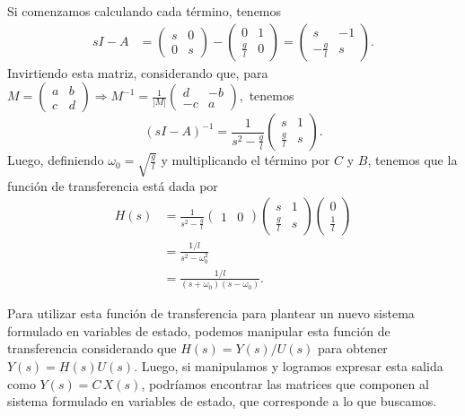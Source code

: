 \documentclass[
  11pt,
  letterpaper,
   addpoints,
  answers
  ]{exam}
\begin{document}
\begin{questions}
\begin{solution}
Si comenzamos calculando cada término, tenemos
\begin{align}
sI-A&=
\begin{pmatrix}s&0\\[2pt]0&s\end{pmatrix}-
\begin{pmatrix}0&1\\[2pt]\frac{g}{l}&0\end{pmatrix}
=
\begin{pmatrix}
s&-1\\[2pt]
-\frac{g}{l}&s
\end{pmatrix}.
\end{align}
Invirtiendo esta matriz, considerando que, para
\(
M=\begin{pmatrix}a&b\\ c&d\end{pmatrix}
\Rightarrow
M^{-1}=\frac{1}{|M|}
\begin{pmatrix}d&-b\\ -c&a\end{pmatrix},
\)
tenemos
\begin{equation}
(sI-A)^{-1}=\frac{1}{s^{2}-\frac{g}{l}}
\begin{pmatrix}
s&1\\[2pt]
\frac{g}{l}&s
\end{pmatrix}.
\end{equation}
Luego, definiendo $\omega_0=\sqrt{\frac{g}{l}}$ y multiplicando el término por $C$ y $B$, tenemos que la función de transferencia está dada por
\begin{align}
H(s)
&=\frac{1}{s^{2}-\frac{g}{l}}
\begin{pmatrix}1&0\end{pmatrix}
\begin{pmatrix}
s&1\\[2pt]\frac{g}{l}&s
\end{pmatrix}
\begin{pmatrix}0\\[2pt]\frac{1}{l}\end{pmatrix}\\
&=\frac{1/l}{s^{2}-\omega_{0}^{2}}\\
&=\frac{1/l}{(s+\omega_0)(s-\omega_0)}.
\end{align}

Para utilizar esta función de transferencia para plantear un nuevo sistema formulado en variables de estado, podemos manipular esta función de transferencia considerando que $H(s)=Y(s)/U(s)$ para obtener $Y(s)=H(s)U(s)$. Luego, si manipulamos y logramos expresar esta salida como $Y(s)=C\,X(s)$, podríamos encontrar las matrices que componen al sistema formulado en variables de estado, que corresponde a lo que buscamos.


\end{solution}
\end{questions}
\end{document}

